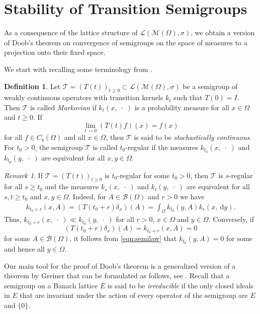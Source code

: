 \documentclass{amsart}
\numberwithin{equation}{section}
\theoremstyle{remark}
\newtheorem{rem}[thm]{Remark}
\theoremstyle{definition}
\newtheorem{defn}[thm]{Definition}
\begin{document}
\section{Stability of Transition Semigroups}
\label{sec:doob}

As a consequence of the lattice structure of $\mathscr{L}(\mathscr{M}(\Omega),\sigma)$, we obtain
a version of Doob's theorem on convergence of semigroups on the space of measures to a projection
onto their fixed space.

We start with recalling some terminology from \cite{daprato1996}.

\begin{defn}
	Let $\mathscr{T} =(T(t))_{t\geq 0} \subset \mathscr{L}(\mathscr{M}(\Omega),\sigma)$ be a semigroup of weakly continuous operators
	with transition kernels $k_t$ such that $T(0)=I$.
	Then $\mathscr{T}$ is called \emph{Markovian} if $k_t(x,\;\cdot\;)$ is a probability measure for all
	$x\in \Omega$ and $t\geq 0$.
	If
	\[ \lim_{t\to 0} (T(t)f)(x) = f(x)\]
	for all $f\in C_b(\Omega)$ and all $x\in\Omega$, then $\mathscr{T}$ is said to be \emph{stochastically continuous}.
	For $t_0>0$, the semigroup $\mathscr{T}$ is called $t_0$-regular if 
	the measures $k_{t_0}(x,\;\cdot\;)$ and $k_{t_0}(y,\;\cdot\;)$ are equivalent for all $x,y\in\Omega$.
\end{defn}

\begin{rem}
\label{rem:t0-regular}
	If $\mathscr{T}=(T(t))_{t\geq 0}$ is $t_0$-regular for some $t_0 >0$, then $\mathscr{T}$ is $s$-regular for all $s\geq t_0$
	and the measures $k_s(x,\;\cdot\;)$ and $k_t(y,\;\cdot\;)$ are equivalent for all $s,t\geq t_0$ and $x,y\in \Omega$.
	Indeed, for $A\in\mathscr{B}(\Omega)$ and $r>0$ we have
	\begin{align}
	 k_{t_0+r}(x,A) = (T(t_0 +r)\delta_x)(A) = \int_\Omega k_{t_0}(y,A) k_{r}(x,{\:\mathrm{d}} y).
	 \label{eqn:semilaw}
	 \end{align}
	Thus,
	$k_{t_0+r}(x,\;\cdot\;) \ll k_{t_0}(y,\;\cdot\;)$ for all $r>0$, $x\in\Omega$ and $y\in\Omega$.
	Conversely, if 
	\[ (T(t_0+r)\delta_x)(A) =k_{t_0+r}(x,A)  = 0\]
	for some $A\in\mathscr{B}(\Omega)$, it follows from \eqref{eqn:semilaw} that
	$k_{t_0}(y,A)=0$ for some and hence all $y\in\Omega$.
\end{rem}

Our main tool for the proof of Doob's theorem is a generalized version of a theorem by Greiner \cite[Kor.\ 3.9]{greiner1982}
that can be formulated as follows, see \cite[Prop 4.1]{gerlach2012b}.
Recall that a semigroup on a Banach lattice $E$ is said to be \emph{irreducible} if 
the only closed ideals in $E$ that are invariant under the action of every operator of the semigroup 
are $E$ and $\{0\}$.
\end{document}
